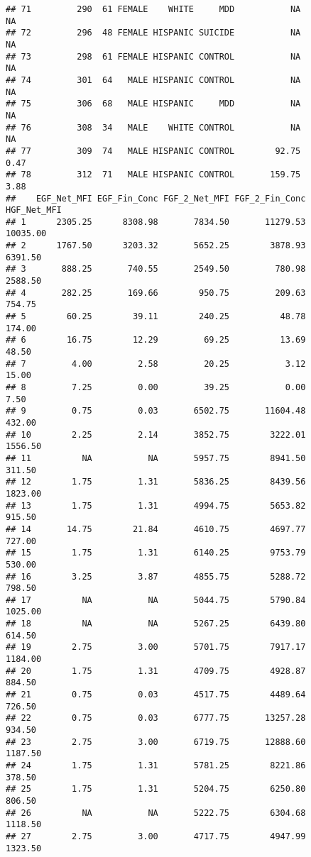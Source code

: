 \documentclass[]{article}
\begin{document}
\begin{verbatim}
## 71         290  61 FEMALE    WHITE     MDD           NA            NA
## 72         296  48 FEMALE HISPANIC SUICIDE           NA            NA
## 73         298  61 FEMALE HISPANIC CONTROL           NA            NA
## 74         301  64   MALE HISPANIC CONTROL           NA            NA
## 75         306  68   MALE HISPANIC     MDD           NA            NA
## 76         308  34   MALE    WHITE CONTROL           NA            NA
## 77         309  74   MALE HISPANIC CONTROL        92.75          0.47
## 78         312  71   MALE HISPANIC CONTROL       159.75          3.88
##    EGF_Net_MFI EGF_Fin_Conc FGF_2_Net_MFI FGF_2_Fin_Conc HGF_Net_MFI
## 1      2305.25      8308.98       7834.50       11279.53    10035.00
## 2      1767.50      3203.32       5652.25        3878.93     6391.50
## 3       888.25       740.55       2549.50         780.98     2588.50
## 4       282.25       169.66        950.75         209.63      754.75
## 5        60.25        39.11        240.25          48.78      174.00
## 6        16.75        12.29         69.25          13.69       48.50
## 7         4.00         2.58         20.25           3.12       15.00
## 8         7.25         0.00         39.25           0.00        7.50
## 9         0.75         0.03       6502.75       11604.48      432.00
## 10        2.25         2.14       3852.75        3222.01     1556.50
## 11          NA           NA       5957.75        8941.50      311.50
## 12        1.75         1.31       5836.25        8439.56     1823.00
## 13        1.75         1.31       4994.75        5653.82      915.50
## 14       14.75        21.84       4610.75        4697.77      727.00
## 15        1.75         1.31       6140.25        9753.79      530.00
## 16        3.25         3.87       4855.75        5288.72      798.50
## 17          NA           NA       5044.75        5790.84     1025.00
## 18          NA           NA       5267.25        6439.80      614.50
## 19        2.75         3.00       5701.75        7917.17     1184.00
## 20        1.75         1.31       4709.75        4928.87      884.50
## 21        0.75         0.03       4517.75        4489.64      726.50
## 22        0.75         0.03       6777.75       13257.28      934.50
## 23        2.75         3.00       6719.75       12888.60     1187.50
## 24        1.75         1.31       5781.25        8221.86      378.50
## 25        1.75         1.31       5204.75        6250.80      806.50
## 26          NA           NA       5222.75        6304.68     1118.50
## 27        2.75         3.00       4717.75        4947.99     1323.50

\end{verbatim}
\end{document}
